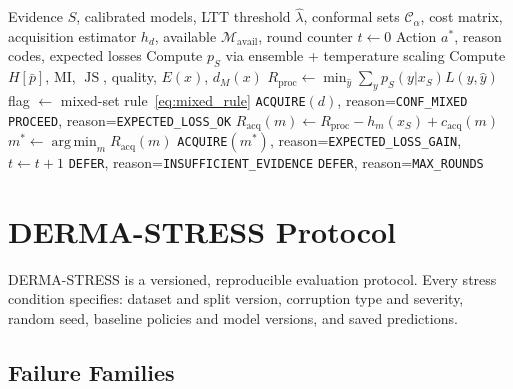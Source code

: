 \documentclass[conference]{IEEEtran}
\DeclareMathOperator*{\argmin}{arg\,min}
\DeclareMathOperator{\JS}{JS}
\newcommand{\1}{\mathbf{1}}
\begin{document}
\begin{algorithm}[t]
\caption{EADE: Evidence-Adaptive Decision Engine}
\label{alg:eade}
\begin{algorithmic}[1]
  \REQUIRE Evidence $S$, calibrated models, LTT threshold $\hat\lambda$,
           conformal sets $\mathcal{C}_\alpha$, cost matrix,
           acquisition estimator $h_d$, available $\mathcal{M}_{\text{avail}}$,
           round counter $t \leftarrow 0$
  \ENSURE  Action $a^*$, reason codes, expected losses
    \STATE Compute $p_S$ via ensemble + temperature scaling
    \STATE Compute $H[\bar p]$, MI, $\JS$, quality, $E(x)$, $d_M(x)$
    \STATE $R_{\text{proc}} \leftarrow \min_{\hat y}\sum_y p_S(y|x_S)L(y,\hat y)$
    \STATE flag $\leftarrow$ mixed-set rule~\eqref{eq:mixed_rule}
      \RETURN \texttt{ACQUIRE}$(d)$, reason=\texttt{CONF\_MIXED}
    \ENDIF
      \RETURN \texttt{PROCEED}, reason=\texttt{EXPECTED\_LOSS\_OK}
    \ENDIF
      \STATE $R_{\text{acq}}(m) \leftarrow R_{\text{proc}} - h_m(x_S) + c_{\text{acq}}(m)$
    \ENDFOR
    \STATE $m^* \leftarrow \argmin_m R_{\text{acq}}(m)$
      \RETURN \texttt{ACQUIRE}$(m^*)$, reason=\texttt{EXPECTED\_LOSS\_GAIN},
              $t \leftarrow t+1$
    \ELSE
      \RETURN \texttt{DEFER}, reason=\texttt{INSUFFICIENT\_EVIDENCE}
    \ENDIF
  \ENDWHILE
  \RETURN \texttt{DEFER}, reason=\texttt{MAX\_ROUNDS}
\end{algorithmic}
\end{algorithm}

\section{DERMA-STRESS Protocol}
\label{sec:stress}

DERMA-STRESS is a versioned, reproducible evaluation protocol. Every stress
condition specifies: dataset and split version, corruption type and severity,
random seed, baseline policies and model versions, and saved predictions.

\subsection{Failure Families}
\end{document}
